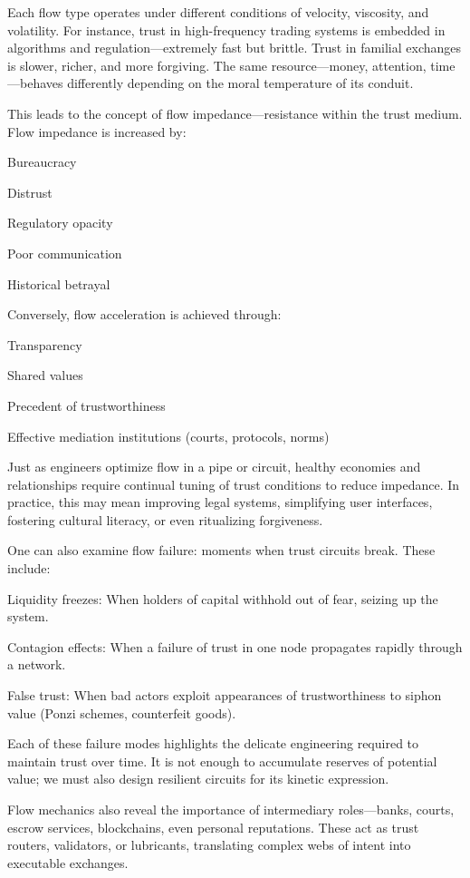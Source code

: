 \documentclass[11pt,oneside]{book}
\begin{document}
Each flow type operates under different conditions of velocity, viscosity, and volatility. For instance, trust in high-frequency trading systems is embedded in algorithms and regulation—extremely fast but brittle. Trust in familial exchanges is slower, richer, and more forgiving. The same resource—money, attention, time—behaves differently depending on the moral temperature of its conduit.

This leads to the concept of flow impedance—resistance within the trust medium. Flow impedance is increased by:

    Bureaucracy

    Distrust

    Regulatory opacity

    Poor communication

    Historical betrayal

Conversely, flow acceleration is achieved through:

    Transparency

    Shared values

    Precedent of trustworthiness

    Effective mediation institutions (courts, protocols, norms)

Just as engineers optimize flow in a pipe or circuit, healthy economies and relationships require continual tuning of trust conditions to reduce impedance. In practice, this may mean improving legal systems, simplifying user interfaces, fostering cultural literacy, or even ritualizing forgiveness.

One can also examine flow failure: moments when trust circuits break. These include:

    Liquidity freezes: When holders of capital withhold out of fear, seizing up the system.

    Contagion effects: When a failure of trust in one node propagates rapidly through a network.

    False trust: When bad actors exploit appearances of trustworthiness to siphon value (Ponzi schemes, counterfeit goods).

Each of these failure modes highlights the delicate engineering required to maintain trust over time. It is not enough to accumulate reserves of potential value; we must also design resilient circuits for its kinetic expression.

Flow mechanics also reveal the importance of intermediary roles—banks, courts, escrow services, blockchains, even personal reputations. These act as trust routers, validators, or lubricants, translating complex webs of intent into executable exchanges.
\end{document}
